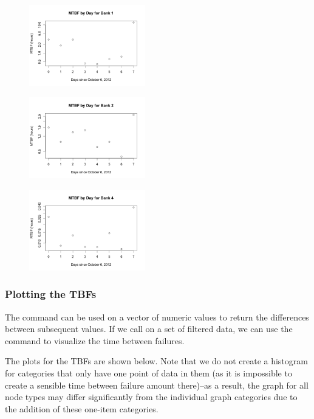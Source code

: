 \begin{figure}
\centering
\includegraphics[width=0.45\textwidth]{images/mtbf_1.png}
\end{figure}

\begin{figure}
\centering
\includegraphics[width=0.45\textwidth]{images/mtbf_2.png}
\end{figure}

\begin{figure}
\centering
\includegraphics[width=0.45\textwidth]{images/mtbf_4.png}
\end{figure}

\subsubsection{Plotting the TBFs}

The  command can be used on a vector of numeric values to return the differences between subsequent values.  If we call  on a set of filtered data, we can use the  command to visualize the time between failures.

The plots for the TBFs are shown below.  Note that we do not create a histogram for categories that only have one point of data in them (as it is impossible to create a sensible time between failure amount there)--as a result, the graph for all node types may differ significantly from the individual graph categories due to the addition of these one-item categories.


